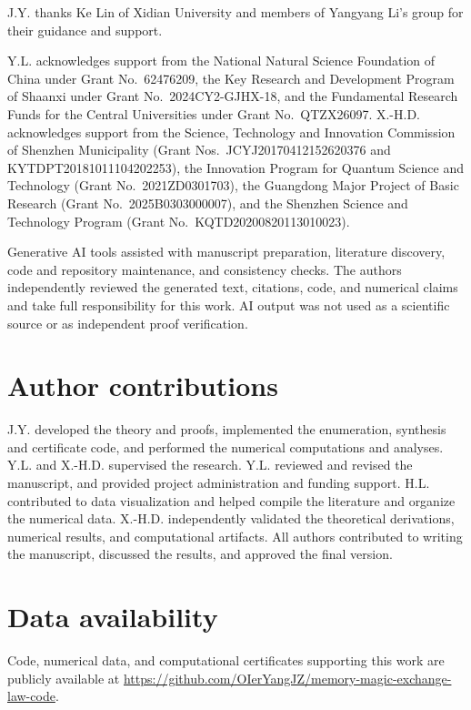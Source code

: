 \documentclass[aps,prx,twocolumn,superscriptaddress,nofootinbib,longbibliography]{revtex4-2}
\theoremstyle{plain}
\theoremstyle{definition}
\theoremstyle{remark}
\begin{document}
\begin{acknowledgments}
J.Y. thanks Ke Lin of Xidian University and members of Yangyang Li's group
for their guidance and support.

Y.L. acknowledges support from the National Natural Science Foundation of
China under Grant No.~62476209, the Key Research and Development Program of
Shaanxi under Grant No.~2024CY2-GJHX-18, and the Fundamental Research Funds
for the Central Universities under Grant No.~QTZX26097. X.-H.D.
acknowledges support from the Science, Technology and Innovation Commission of Shenzhen
Municipality (Grant Nos.~JCYJ20170412152620376 and KYTDPT20181011104202253),
the Innovation Program for Quantum Science and Technology (Grant
No.~2021ZD0301703), the Guangdong Major Project of Basic Research (Grant
No.~2025B0303000007), and the Shenzhen Science and Technology Program
(Grant No.~KQTD20200820113010023).

Generative AI tools assisted with manuscript preparation, literature discovery,
code and repository maintenance, and consistency checks. The authors
independently reviewed the generated text, citations, code, and numerical claims
and take full responsibility for this work. AI output was not used as a
scientific source or as independent proof verification.
\end{acknowledgments}

\section*{Author contributions}
J.Y. developed the theory and proofs, implemented the enumeration, synthesis and certificate code, and performed the numerical computations and analyses. Y.L. and X.-H.D. supervised the research. Y.L. reviewed and revised the manuscript, and provided project administration and funding support. H.L. contributed to data visualization and helped compile the literature and organize the numerical data. X.-H.D. independently validated the theoretical derivations, numerical results, and computational artifacts. All authors contributed to writing the manuscript, discussed the results, and approved the final version.

\section*{Data availability}
{\raggedright
Code, numerical data, and computational certificates supporting this work are publicly available at \url{https://github.com/OIerYangJZ/memory-magic-exchange-law-code}.\par}
\end{document}
